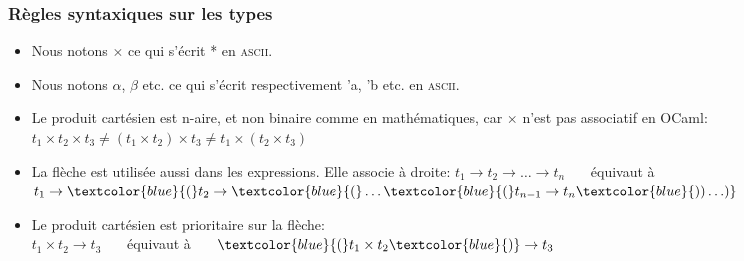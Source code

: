 %
\begin{frame}
\frametitle{Règles syntaxiques sur les types}

\begin{itemize}

  \item Nous notons $\times$ ce qui s'écrit \textsf{*} en
  \textsc{ascii}.

   \item Nous notons $\alpha$, $\beta$ etc. ce qui s'écrit
     respectivement \textsf{'a}, \textsf{'b} etc. en \textsc{ascii}.

  \item Le produit cartésien est n-aire, et non binaire comme en
    mathématiques, car $\times$ n'est pas associatif en OCaml: $t_1
    \times t_2 \times t_3 \neq (t_1 \times t_2) \times t_3 \neq t_1
    \times (t_2 \times t_3)$

  \item La flèche est utilisée aussi dans les expressions. Elle
    associe à droite: $t_1 \rightarrow t_2 \rightarrow \ldots
    \rightarrow t_n$ \ \ \ équivaut à \ \ \ $t_1 \rightarrow
    \textcolor{blue}{(}t_2 \rightarrow \textcolor{blue}{(} \ldots
    \textcolor{blue}{(}t_{n-1} \rightarrow t_n\textcolor{blue}{))
      \ldots )}$

  \item Le produit cartésien est prioritaire sur la flèche:\\ $t_1
    \times t_2 \rightarrow t_3$ \ \ \ équivaut à
    \ \ \ $\textcolor{blue}{(}t_1 \times t_2\textcolor{blue}{)}
    \rightarrow t_3$

\end{itemize}

\end{frame}

